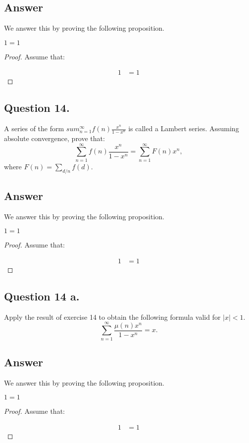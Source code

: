 \subsection*{Answer}
\noindent
We answer this by proving the following proposition.

\begin{proposition}
    $1=1$
\end{proposition}

\begin{proof}
    Assume that:

    \begin{align*}
        1 &= 1
    \end{align*}

\end{proof}


\subsection{Question 14.}
\noindent
A series of the form $sum_{n=1}^{\infty}f(n)\frac{x^n}{1-x^n}$ is called a Lambert series. Assuming absolute
convergence, prove that:
\[
    \sum_{n=1}^{\infty}f(n) \frac{x^n}{1-x^n} = \sum_{n=1}^{\infty} F(n)x^n,
\]
where $F(n) = \sum_{d/n}f(d)$.

\subsection*{Answer}
\noindent
We answer this by proving the following proposition.

\begin{proposition}
    $1=1$
\end{proposition}

\begin{proof}
    Assume that:

    \begin{align*}
        1 &= 1
    \end{align*}

\end{proof}


\subsection{Question 14 a.}
\noindent
Apply the result of exercise 14 to obtain the following formula valid for $|x|<1$.
\[
    \sum_{n=1}^{\infty} \frac{\mu(n) x^n}{1-x^n} = x.
\]

\subsection*{Answer}
\noindent
We answer this by proving the following proposition.

\begin{proposition}
    $1=1$
\end{proposition}

\begin{proof}
    Assume that:

    \begin{align*}
        1 &= 1
    \end{align*}

\end{proof}
